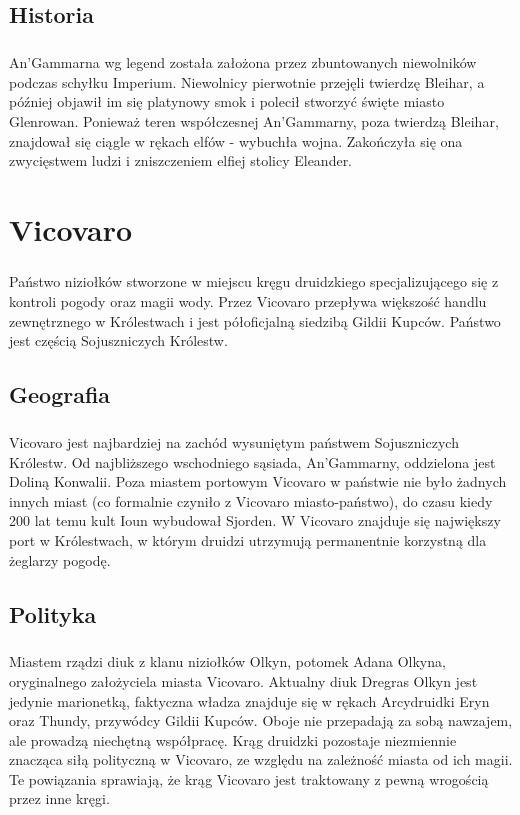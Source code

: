 \documentclass[10pt,twoside,twocolumn]{book}
\begin{document}
\section{Historia}
\paragraph{}
An'Gammarna wg legend została założona przez zbuntowanych niewolników podczas schyłku Imperium.
Niewolnicy pierwotnie przejęli twierdzę Bleihar, a później objawił im się platynowy smok i polecił stworzyć święte miasto Glenrowan.
Ponieważ teren współczesnej An'Gammarny, poza twierdzą Bleihar, znajdował się ciągle w rękach elfów - wybuchła wojna.
Zakończyła się ona zwycięstwem ludzi i zniszczeniem elfiej stolicy Eleander.

\chapter{Vicovaro}

\paragraph{}
Państwo niziołków stworzone w miejscu kręgu druidzkiego specjalizującego się z kontroli pogody oraz magii wody. 
Przez Vicovaro przepływa większość handlu zewnętrznego w Królestwach i jest półoficjalną siedzibą Gildii Kupców.
Państwo jest częścią Sojuszniczych Królestw.

\section{Geografia}
\paragraph{}
Vicovaro jest najbardziej na zachód wysuniętym państwem Sojuszniczych Królestw. 
Od najbliższego wschodniego sąsiada, An'Gammarny, oddzielona jest Doliną Konwalii. 
Poza miastem portowym Vicovaro w państwie nie było żadnych innych miast (co formalnie czyniło z Vicovaro miasto-państwo), do czasu kiedy 200 lat temu kult Ioun wybudował Sjorden. 
W Vicovaro znajduje się największy port w Królestwach, w którym druidzi utrzymują permanentnie korzystną dla żeglarzy pogodę.

\section{Polityka}
\paragraph{}
Miastem rządzi diuk z klanu niziołków Olkyn, potomek Adana Olkyna, oryginalnego założyciela miasta Vicovaro. 
Aktualny diuk Dregras Olkyn jest jedynie marionetką, faktyczna władza znajduje się w rękach Arcydruidki Eryn oraz Thundy, przywódcy Gildii Kupców. 
Oboje nie przepadają za sobą nawzajem, ale prowadzą niechętną współpracę. 
Krąg druidzki pozostaje niezmiennie znacząca siłą polityczną w Vicovaro, ze względu na zależność miasta od ich magii. 
Te powiązania sprawiają, że krąg Vicovaro jest traktowany z pewną wrogością przez inne kręgi.
\end{document}
